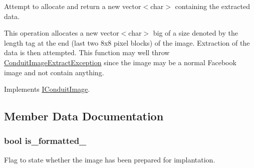 Attempt to allocate and return a new vector$<$char$>$ containing the extracted data. 

This operation allocates a new vector$<$char$>$ big of a size denoted by the length tag at the end (last two 8x8 pixel blocks) of the image. Extraction of the data is then attempted. This function may well throw \hyperlink{classefb_1_1ConduitImageExtractException}{ConduitImageExtractException} since the image may be a normal Facebook image and not contain anything. 

Implements \hyperlink{classefb_1_1IConduitImage_a920c1ba3f4f8d7531a8b6f8c8b38def6}{IConduitImage}.



\subsection{Member Data Documentation}
\hypertarget{classefb_1_1HaarConduitImage_aba28e7654a4ce9835d571c3daaebc43c}{
\subsubsection[{is\_\-formatted\_\-}]{\setlength{\rightskip}{0pt plus 5cm}bool {\bf is\_\-formatted\_\-}}}
\label{classefb_1_1HaarConduitImage_aba28e7654a4ce9835d571c3daaebc43c}


Flag to state whether the image has been prepared for implantation. 

